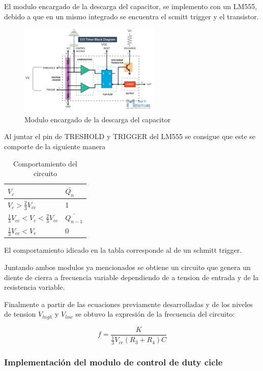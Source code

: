 \documentclass[../../ASSD_TP1_G7.tex]{subfiles}
\begin{document}
\par El modulo encargado de la descarga del capacitor, se implemento con un LM555, debido a que en un mismo integrado se encuentra el scmitt trigger y el transistor. 
\begin{figure}[H]
\centering
\includegraphics[width=0.6\textwidth]{figures/descargaC.png}
\caption{Modulo encargado de la descarga del capacitor}\label{fig:descargac}
\end{figure}

Al juntar  el pin de TRESHOLD y TRIGGER del LM555 se consigue que este se comporte de la siguiente manera

\begin{table}[htbp]
\begin{center}
\begin{tabular}{|l|l|}
\hline
$V_c$ & $\bar{Q_n}$ \\
\hline \hline
$V_c>\frac{2}{3}V_{cc}$ & 1 \\ \hline
$\frac{1}{3}V_{cc}<V_c<\frac{2}{3}V_{cc}$ & $\bar{Q_{n-1}}$ \\ \hline
$\frac{1}{3}V_{cc}<V_c$ & 0 \\ \hline
\end{tabular}
\caption{Comportamiento del circuito}

\end{center}
\end{table}
El comportamiento idicado en la tabla corresponde al de un schmitt trigger.

\par Juntando ambos modulos ya mencionados se obtiene un circuito que genera un diente de cierra a frecuencia variable dependiendo de a tension de entrada y de la resistencia variable.
\par Finalmente a partir de las ecuaciones previamente desarrolladas y de los niveles de tension $V_{high}$ y $V_{low}$ se obtuvo la expresión de la frecuencia del circuito:

\begin{equation}
f=\frac{K}{\frac{1}{3}V_{cc} (R_3+R_4) C}
\end{equation}

\subsubsection*{Implementación del modulo de control de duty cicle}
\end{document}
